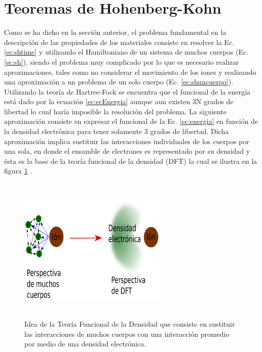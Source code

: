   \section{Teoremas de Hohenberg-Kohn} \label{sec:Ho-Ko}
  Como se ha dicho en la secci\'on anterior, el problema fundamental en la descripci\'on de  las propiedades de los materiales consiste en resolver la Ec.  \ref{ec:shtime} y utilizando el Hamiltoniano de un sistema de muchos cuerpos (Ec. \ref{ec:sh}), siendo el problema muy complicado por lo que es necesario realizar aproximaciones, tales como no considerar el movimiento de los iones y realizando una aproximaci\'on a un problema de un solo cuerpo (Ec. \ref{ec:shuncuerpo}). Utilizando la teor\'ia de Hartree-Fock se encuentra que el funcional de la energ\'ia est\'a dado por la ecuaci\'on \ref{ec:ecEnergia} aunque aun existen 3N grados de libertad lo cual har\'ia imposible la resoluci\'on del problema. La siguiente aproximaci\'on consiste en expresar el funcional de la Ec. \ref{ec:energia} en funci\'on de la densidad electr\'onica para tener solamente 3 grados de libertad. Dicha aproximaci\'on implica  sustituir las interacciones individuales de los cuerpos por una sola, en donde el ensamble de electrones es representado por su densidad y \'esta es la base de la teor\'ia funcional de la densidad (DFT) la cual se ilustra en la figura \ref{im:dftIdea} \cite{MB-2015}.
  \begin{figure}[!hbt]
  	\centering
  	\includegraphics[width=7.0cm,height=7.0cm]{figuras/perspectivaDFT.eps}
  	\caption[Perspectiva de la teor\'ia Funcional de la Densidad.]{Idea de la Teor\'ia Funcional de la Densidad que consiste en sustituir las interacciones de muchos cuerpos con una interacci\'on promedio por medio de una densidad electr\'onica. \cite{MB-2015}}
  	\label{im:dftIdea}
  \end{figure}
  
